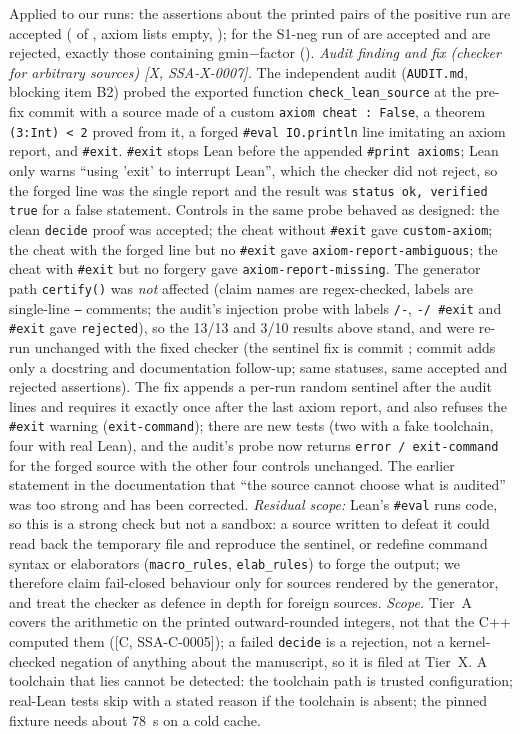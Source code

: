 \documentclass[10pt]{article}
\newcommand{\tier}[1]{\textsf{[#1]}}
\newcommand{\lean}[1]{\texttt{#1}}
\newcommand{\hash}[1]{\texttt{\expandafter\seqsplit\expandafter{#1}}}
\begin{document}
Applied to our runs: the \SSALFPosN{} assertions about the printed pairs of the positive run are accepted (\SSALFPosAcc{} of \SSALFPosN, axiom lists empty, \SSALFLean); for the S1-neg run \SSALFNegAcc{} of \SSALFNegN{} are accepted and \SSALFNFailed{} are rejected, exactly those containing gmin$-$factor (\SSALFFailedList).
\emph{Audit finding and fix (checker for arbitrary sources) \tier{X, SSA-X-0007}.} The independent audit (\texttt{AUDIT.md}, blocking item B2) probed the exported function \texttt{check\_lean\_source} at the pre-fix commit \hash{\SSALFOldCommit} with a source made of a custom \lean{axiom cheat : False}, a theorem \lean{(3:Int) < 2} proved from it, a forged \lean{\#eval IO.println} line imitating an axiom report, and \lean{\#exit}. \lean{\#exit} stops Lean before the appended \lean{\#print axioms}; Lean only warns ``using 'exit' to interrupt Lean'', which the checker did not reject, so the forged line was the single report and the result was \texttt{status ok, verified true} for a false statement. Controls in the same probe behaved as designed: the clean \lean{decide} proof was accepted; the cheat without \lean{\#exit} gave \texttt{custom-axiom}; the cheat with the forged line but no \lean{\#exit} gave \texttt{axiom-report-ambiguous}; the cheat with \lean{\#exit} but no forgery gave \texttt{axiom-report-missing}. The generator path \texttt{certify()} was \emph{not} affected (claim names are regex-checked, labels are single-line \texttt{--} comments; the audit's injection probe with labels \lean{/-}, \lean{-/ \#exit} and \lean{\#exit} gave \texttt{rejected}), so the 13/13 and 3/10 results above stand, and were re-run unchanged with the fixed checker (the sentinel fix is commit \hash{\SSALFFixCommit}; commit \hash{\SSALFCommit} adds only a docstring and documentation follow-up; same statuses, same accepted and rejected assertions). The fix appends a per-run random sentinel after the audit lines and requires it exactly once after the last axiom report, and also refuses the \lean{\#exit} warning (\texttt{exit-command}); there are \SSALFNNew{} new tests (two with a fake toolchain, four with real Lean), and the audit's probe now returns \texttt{error / exit-command} for the forged source with the other four controls unchanged. The earlier statement in the documentation that ``the source cannot choose what is audited'' was too strong and has been corrected. \emph{Residual scope:} Lean's \lean{\#eval} runs code, so this is a strong check but not a sandbox: a source written to defeat it could read back the temporary file and reproduce the sentinel, or redefine command syntax or elaborators (\lean{macro\_rules}, \lean{elab\_rules}) to forge the output; we therefore claim fail-closed behaviour only for sources rendered by the generator, and treat the checker as defence in depth for foreign sources.
\emph{Scope.} Tier~A covers the arithmetic on the printed outward-rounded integers, not that the C++ computed them (\tier{C, SSA-C-0005}); a failed \lean{decide} is a rejection, not a kernel-checked negation of anything about the manuscript, so it is filed at Tier~X. A toolchain that lies cannot be detected: the toolchain path is trusted configuration; real-Lean tests skip with a stated reason if the toolchain is absent; the pinned fixture needs about 78~s on a cold cache.
\end{document}
